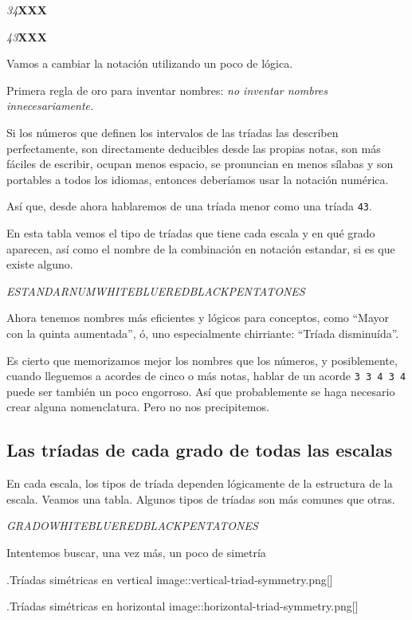 \documentclass[]{article}
\begin{document}
\emph{34}\textbf{X}\textbf{X}\textbf{X}

\emph{43}\textbf{X}\textbf{X}\textbf{X}

Vamos a cambiar la notación utilizando un poco de lógica.

Primera regla de oro para inventar nombres: \emph{no inventar nombres   innecesariamente.}

Si los números que definen los intervalos de las tríadas las describen perfectamente, son directamente deducibles desde las propias notas, son más fáciles de escribir, ocupan menos espacio, se pronuncian en menos sílabas y son portables a todos los idiomas, entonces deberíamos usar la notación numérica.

Así que, desde ahora hablaremos de una tríada menor como una tríada \texttt{43}.

En esta tabla vemos el tipo de tríadas que tiene cada escala y en qué grado aparecen, así como el nombre de la combinación en notación estandar, si es que existe alguno.

\emph{ESTANDAR}\emph{NUM}\emph{WHITE}\emph{BLUE}\emph{RED}\emph{BLACK}\emph{PENTA}\emph{TONES}

Ahora tenemos nombres más eficientes y lógicos para conceptos, como ``Mayor con la quinta aumentada'', ó, uno especialmente chirriante: ``Tríada disminuída''.

Es cierto que memorizamos mejor los nombres que los números, y posiblemente, cuando lleguemos a acordes de cinco o más notas, hablar de un acorde \texttt{3\ 3\ 4\ 3\ 4} puede ser también un poco engorroso. Así que probablemente se haga necesario crear alguna nomenclatura. Pero no nos precipitemos.

\subsection{Las tríadas de cada grado de todas las escalas}

En cada escala, los tipos de tríada dependen lógicamente de la estructura de la escala. Veamos una tabla. Algunos tipos de tríadas son más comunes que otras.

\emph{GRADO}\emph{WHITE}\emph{BLUE}\emph{RED}\emph{BLACK}\emph{PENTA}\emph{TONES}

Intentemos buscar, una vez más, un poco de simetría

.Tríadas simétricas en vertical image::vertical-triad-symmetry.png{[}{]}

.Tríadas simétricas en horizontal image::horizontal-triad-symmetry.png{[}{]}
\end{document}
